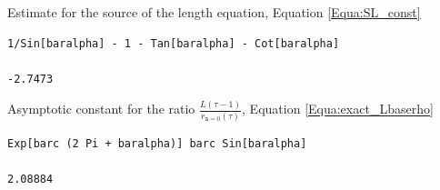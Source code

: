 \documentclass[reqno]{amsart}
\theoremstyle{definition} \newtheorem{definition}{Definition}[section]
\theoremstyle{definition} \newtheorem{remark}[definition]{Remark}
\theoremstyle{plain} \newtheorem{lemma}[definition]{Lemma}
\theoremstyle{plain} \newtheorem{proposition}[definition]{Proposition}
\theoremstyle{plain} \newtheorem{theorem}[definition]{Theorem}
\theoremstyle{plain} \newtheorem{corollary}[definition]{Corollary}
\theoremstyle{definition} \newtheorem{example}[definition]{Example}
\theoremstyle{plain} \newtheorem{claim}[clai]{Claim}
\theoremstyle{definition} \newtheorem{assumption}[definition]{Assumption}
\theoremstyle{definition} \newtheorem{observation}[definition]{Observation}
\newcommand{\1}{\mathbbm 1}
\numberwithin{equation}{section} %
\theoremstyle{plain} \newtheorem*{theorem*}{Theorem}
\theoremstyle{plain} \newtheorem{mthm}[maintheorem]{Main Theorem}
\theoremstyle{plain} \newtheorem*{mthm*}{Main Theorem}
\theoremstyle{plain} \newtheorem*{conjecture*}{Conjecture}
\theoremstyle{plain} \newtheorem{conjecture}[definition]{Conjecture}
\theoremstyle{plain} \newtheorem*{problem*}{Problem}
\begin{document}
\medskip
Estimate for the source of the length equation, Equation \eqref{Equa:SL_const}
\medskip
\begin{verbatim}
1/Sin[baralpha] - 1 - Tan[baralpha] - Cot[baralpha]

-2.7473
\end{verbatim}
\medskip
Asymptotic constant for the ratio $\frac{L(\tau-1)}{r_{\mathtt a=0}(\tau)}$, Equation \eqref{Equa:exact_Lbaserho}
\medskip
\begin{verbatim}
Exp[barc (2 Pi + baralpha)] barc Sin[baralpha]

2.08884
\end{verbatim}
\medskip

\bigskip


\bigskip
\end{document}
